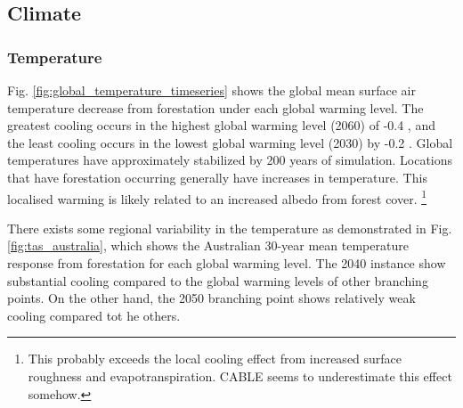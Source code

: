 \documentclass[]{article}
\begin{document}
\subsection{Climate}

\subsubsection{Temperature}

Fig. \ref{fig:global_temperature_timeseries} shows the global mean surface air temperature decrease from forestation under each global warming level.
The greatest cooling occurs in the highest global warming level (2060) of -0.4 \textcelsius, and the least cooling occurs in the lowest global warming level (2030) by -0.2 \textcelsius{}.
Global temperatures have approximately stabilized by 200 years of simulation.
Locations that have forestation occurring generally have increases in temperature.
This localised warming is likely related to an increased albedo from forest cover.
\footnote{This probably exceeds the local cooling effect from increased surface roughness and evapotranspiration. CABLE seems to underestimate this effect somehow.}

There exists some regional variability in the temperature as demonstrated in Fig. \ref{fig:tas_australia}, which shows the Australian 30-year mean temperature response from forestation for each global warming level.
The 2040 instance show substantial cooling compared to the global warming levels of other branching points.
On the other hand, the 2050 branching point shows relatively weak cooling compared tot he others.

%
\end{document}
